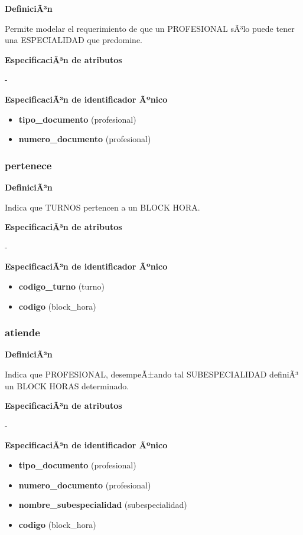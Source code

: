 \documentclass[a4paper,11pt]{article}
\begin{document}
\textbf{DefiniciÃ³n}

Permite modelar el requerimiento de que un PROFESIONAL sÃ³lo puede tener una ESPECIALIDAD 
que predomine.

\textbf{EspecificaciÃ³n de atributos}

-

\textbf{EspecificaciÃ³n de identificador Ãºnico}

\begin{itemize}

     \item \textbf{tipo\_documento} (profesional)

     \item \textbf{numero\_documento} (profesional)

\end{itemize}

\subsubsection{\textbf{pertenece}}

\textbf{DefiniciÃ³n}

Indica que TURNOS pertencen a un BLOCK HORA.

\textbf{EspecificaciÃ³n de atributos}

-

\textbf{EspecificaciÃ³n de identificador Ãºnico}

\begin{itemize}

     \item \textbf{codigo\_turno} (turno)

     \item \textbf{codigo} (block\_hora)

\end{itemize}

\subsubsection{\textbf{atiende}}

\textbf{DefiniciÃ³n}

Indica que PROFESIONAL, desempeÃ±ando tal SUBESPECIALIDAD definiÃ³ un BLOCK 
HORAS determinado.

\textbf{EspecificaciÃ³n de atributos}

-

\textbf{EspecificaciÃ³n de identificador Ãºnico}

\begin{itemize}

     \item \textbf{tipo\_documento} (profesional)

     \item \textbf{numero\_documento} (profesional)

     \item \textbf{nombre\_subespecialidad} (subespecialidad)

     \item \textbf{codigo} (block\_hora)

\end{itemize}
\end{document}
